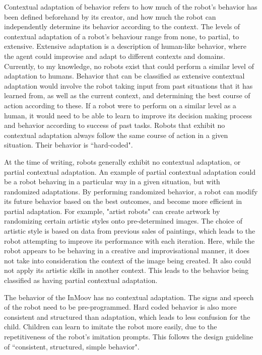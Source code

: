 Contextual adaptation of behavior refers to how much of the robot's behavior has been defined beforehand by its creator, and how much the robot can independently determine its behavior according to the context. The levels of contextual adaptation of a robot's behaviour range from none, to partial, to extensive. Extensive adaptation is a description of human-like behavior, where the agent could improvise and adapt to different contexts and domains. Currently, to my knowledge, no robots exist that could perform a similar level of adaptation to humans. Behavior that can be classified as extensive contextual adaptation would involve the robot taking input from past situations that it has learned from, as well as the current context, and determining the best course of action according to these. If a robot were to perform on a similar level as a human, it would need to be able to learn to improve its decision making process and behavior according to success of past tasks. Robots that exhibit no contextual adaptation always follow the same course of action in a given situation. Their behavior is ``hard-coded".

At the time of writing, robots generally exhibit no contextual adaptation, or partial contextual adaptation. An example of partial contextual adaptation could be a robot behaving in a particular way in a given situation, but with randomized adaptations. By performing randomized behavior, a robot can modify its future behavior based on the best outcomes, and become more efficient in partial adaptation. For example, "artist robots" can create artwork by randomizing certain artistic styles onto pre-determined images. The choice of artistic style is based on data from previous sales of paintings, which leads to the robot attempting to improve its performance with each iteration. Here, while the robot appears to be behaving in a creative and improvisational manner, it does not take into consideration the context of the image being created. It also could not apply its artistic skills in another context. This leads to the behavior being classified as having partial contextual adaptation.

The behavior of the InMoov has no contextual adaptation. The signs and speech of the robot need to be pre-programmed. Hard coded behavior is also more consistent and structured than adaptation, which leads to less confusion for the child. Children can learn to imitate the robot more easily, due to the repetitiveness of the robot's imitation prompts. This follows the design guideline of ``consistent, structured, simple behavior". 


